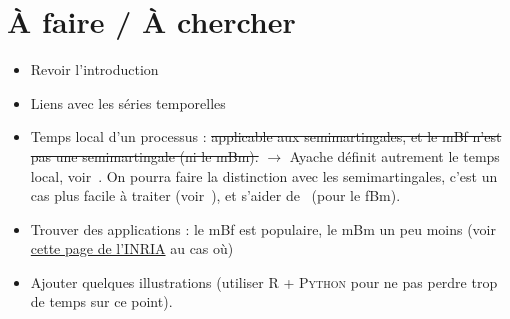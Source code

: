 



\section{À faire / À chercher}
\begin{itemize}
\item Revoir l'introduction
\item Liens avec les séries temporelles
\item Temps local d'un processus : \st{applicable aux semimartingales,
    et le mBf n'est pas une semimartingale (ni le mBm).}
  $\longrightarrow$ Ayache définit autrement le temps local,
  voir~\cite[Sec.~2.2]{ayache2018}. On pourra faire la distinction
  avec les semimartingales, c'est un cas plus facile à traiter
  (voir~\cite[p.~13-14]{yen2013}), et s'aider
  de~\cite[Sec.~10.1]{biagini2008} (pour le fBm).
\item Trouver des applications : le mBf est populaire, le mBm un peu
  moins (voir
  \href{https://team.inria.fr/anja/english-theoretical-aspects/multifractional-brownian-motion/multifractional-brownian-motion-bibliography/}{cette page de l'INRIA}
  au cas où)
\item Ajouter quelques illustrations (utiliser \textsc{R} +
  \textsc{Python} pour ne pas perdre trop de temps sur ce point).
\end{itemize}